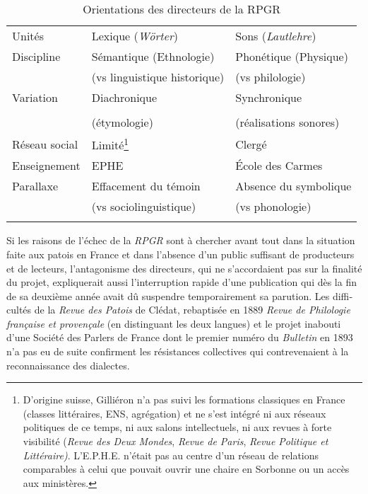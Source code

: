 \documentclass[output=paper]{../langscibook}
\begin{document}
\begin{otherlanguage}{french}
\begin{table}
\begin{tabularx}{\textwidth}{lQQ}
Unités  &   Lexique (\textit{Wörter})  &    Sons (\textit{Lautlehre})\\

Discipline & Sémantique (Ethnologie) &   Phonétique (Physique)\\

   & (vs linguistique historique)  &  (vs philologie)\\

Variation &  Diachronique    &    Synchronique \\
\\
  &  (étymologie)     &   (réalisations sonores) \\

Réseau   social & Limité\footnote{D’origine suisse, Gilliéron n’a pas suivi les formations classiques en France (classes littéraires, ENS, agrégation) et ne s’est intégré ni aux réseaux politiques de ce temps, ni aux salons intellectuels, ni aux revues à forte visibilité (\textit{Revue des Deux Mondes}, \textit{Revue de Paris}, \textit{Revue Politique et Littéraire)}. L’E.P.H.E. n’était pas au centre d’un réseau de relations comparables à celui que pouvait ouvrir une chaire en Sorbonne ou un accès aux ministères.}    &    Clergé \\

Enseignement & EPHE      &    École des Carmes \\

Parallaxe & Effacement du témoin  &    Absence du symbolique\\

 &   (vs sociolinguistique)  &    (vs phonologie)\\
\lspbottomrule
\end{tabularx}
\caption{Orientations des directeurs de la RPGR\label{table: Tab 2.}}
\end{table}

Si les raisons de l’échec de la \textit{RPGR} sont à chercher avant tout dans la situation faite aux patois en France et dans l’absence d’un public suffisant de producteurs et de lecteurs, l’antagonisme des directeurs, qui ne s’accordaient pas sur la finalité du projet, expliquerait aussi l’interruption rapide d’une publication qui dès la fin de sa deuxième année avait dû suspendre temporairement sa parution. Les difficultés de la \textit{Revue des Patois} de Clédat, rebaptisée en 1889 \textit{Revue de Philologie française et provençale} (en distinguant les deux langues) et le projet inabouti d’une Société des Parlers de France dont le premier numéro du \textit{Bulletin} en 1893 n’a pas eu de suite confirment les résistances collectives qui contrevenaient à la reconnaissance des dialectes. 


\end{otherlanguage}
\end{document}
